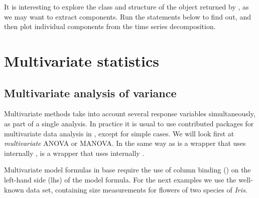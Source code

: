 \documentclass[krantz2]{krantz}\usepackage{knitr}
\begin{document}
\begin{advplayground}
It is interesting to explore the class and structure of the object returned by , as we may want to extract components. Run the statements below to find out, and then plot individual components from the time series decomposition.

\begin{knitrout}\footnotesize
{}\color{fgcolor}\begin{kframe}
\begin{alltt}
\end{alltt}
\end{kframe}
\end{knitrout}
\end{advplayground}


\section{Multivariate statistics}\label{sec:stat:MV}

\subsection{Multivariate analysis of variance}
Multivariate methods take into account several response variables simultaneously, as part of a single analysis. In practice it is usual to use contributed packages for multivariate data analysis in \Rlang, except for simple cases. We will look first at \emph{multivariate} ANOVA or MANOVA. In the same way as  is a wrapper that uses internally ,  is a wrapper that uses internally .

Multivariate model formulas in base \Rlang require the use of column binding () on the left-hand side (lhs) of the model formula. For the next examples we use the well-known  data set, containing size measurements for flowers of two species of \emph{Iris}.
\end{document}
